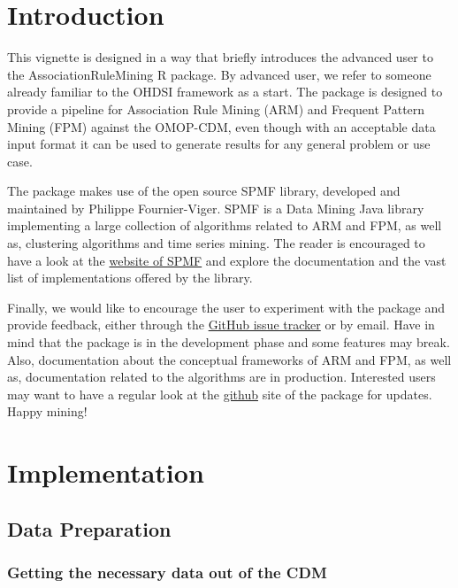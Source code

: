 \documentclass[
]{article}
\begin{document}
\hypertarget{introduction}{%
\section{Introduction}\label{introduction}}

This vignette is designed in a way that briefly introduces the advanced
user to the AssociationRuleMining R package. By advanced user, we refer
to someone already familiar to the OHDSI framework as a start. The
package is designed to provide a pipeline for Association Rule Mining
(ARM) and Frequent Pattern Mining (FPM) against the OMOP-CDM, even
though with an acceptable data input format it can be used to generate
results for any general problem or use case.

The package makes use of the open source SPMF library, developed and
maintained by Philippe Fournier-Viger. SPMF is a Data Mining Java
library implementing a large collection of algorithms related to ARM and
FPM, as well as, clustering algorithms and time series mining. The
reader is encouraged to have a look at the
\href{http://www.philippe-fournier-viger.com/spmf/}{website of SPMF} and
explore the documentation and the vast list of implementations offered
by the library.

Finally, we would like to encourage the user to experiment with the
package and provide feedback, either through the
\href{https://github.com/mi-erasmusmc/AssociationRuleMining/issues}{GitHub
issue tracker} or by email. Have in mind that the package is in the
development phase and some features may break. Also, documentation about
the conceptual frameworks of ARM and FPM, as well as, documentation
related to the algorithms are in production. Interested users may want
to have a regular look at the
\href{https://github.com/mi-erasmusmc/AssociationRuleMining}{github}
site of the package for updates. Happy mining!

\hypertarget{implementation}{%
\section{Implementation}\label{implementation}}

\hypertarget{data-preparation}{%
\subsection{Data Preparation}\label{data-preparation}}

\hypertarget{getting-the-necessary-data-out-of-the-cdm}{%
\subsubsection{Getting the necessary data out of the
CDM}\label{getting-the-necessary-data-out-of-the-cdm}}
\end{document}
